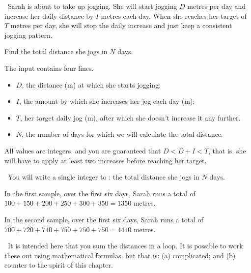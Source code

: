

\Question\ Sarah is about to take up jogging. She will start jogging $D$ metres per day
and increase her daily distance by $I$ metres each day. When she reaches her target of $T$
metres per day, she will stop the daily increase and just keep a consistent jogging
pattern.

Find the total distance she jogs in $N$ days.

\Input

The input contains four lines.
\begin{itemize}
  \item $D$, the distance (m) at which she starts jogging;
  \item $I$, the amount by which she increases her jog each day (m);
  \item $T$, her target daily jog (m), after which she doesn't increase it any further.
  \item $N$, the number of days for which we will calculate the total distance.
\end{itemize}

All values are integers, and you are guaranteed that $D < D+I < T$, that is, she will have
to apply at least two increases before reaching her target.

\Output\ You will write a single integer to \OUT: the total distance she jogs in $N$ days.

\Sample



\Explanation In the first sample, over the first six days, Sarah runs a total of
$100+150+200+250+300+350=1350$ metres.

In the second sample, over the first six days, Sarah runs a total of
$700+720+740+750+750+750=4410$ metres.

\Scratch\ It is intended here that you sum the distances in a loop. It is possible to work
these out using mathematical formulas, but that is: (a) complicated; and (b) counter to
the spirit of this chapter.

